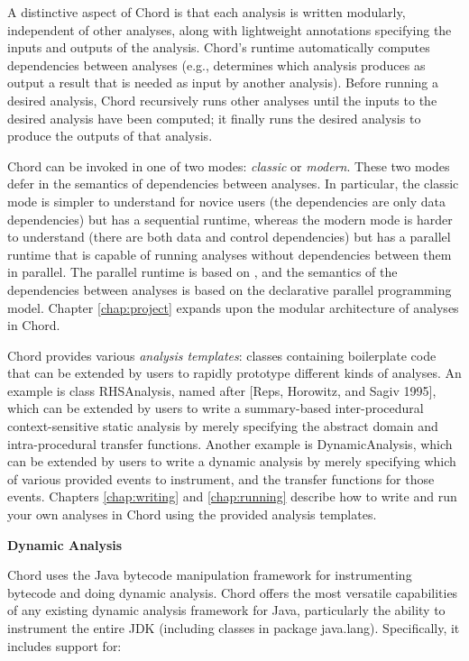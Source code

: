 A distinctive aspect of Chord is that each analysis is written modularly,
independent of other analyses, along with lightweight annotations specifying the
inputs and outputs of the analysis.  Chord's runtime automatically computes
dependencies between analyses (e.g., determines which analysis produces as
output a result that is needed as input by another analysis).  Before running a
desired analysis, Chord recursively runs other analyses until the inputs to the
desired analysis have been computed; it finally runs the desired analysis to
produce the outputs of that analysis.

Chord can be invoked in one of two modes: {\it classic} or {\it modern}.  These
two modes defer in the semantics of dependencies between analyses.  In
particular, the classic mode is simpler to understand for novice users (the
dependencies are only data dependencies) but has a sequential runtime, whereas
the modern mode is harder to understand (there are both data and control
dependencies) but has a parallel runtime that is capable of running analyses
without dependencies between them in parallel.  The parallel runtime is based on
, and the semantics of
the dependencies between analyses is based on the
declarative parallel programming model.  Chapter \ref{chap:project} expands upon
the modular architecture of analyses in Chord.

Chord provides various {\it analysis templates}: classes containing boilerplate
code that can be extended by users to rapidly prototype different kinds of
analyses.  An example is class RHSAnalysis, named after [Reps, Horowitz, and
Sagiv 1995], which can be extended by users to write a summary-based
inter-procedural context-sensitive static analysis by merely specifying the
abstract domain and intra-procedural transfer functions.  Another example is
DynamicAnalysis, which can be extended by users to write a dynamic analysis by
merely specifying which of various provided events to instrument, and the
transfer functions for those events.  Chapters \ref{chap:writing} and
\ref{chap:running} describe how to write and run your own analyses in Chord
using the provided analysis templates.

{\bf Dynamic Analysis}

Chord uses the  Java bytecode
manipulation framework for instrumenting bytecode and doing dynamic analysis.
Chord offers the most versatile capabilities of any existing dynamic analysis
framework for Java, particularly the ability to instrument the entire JDK
(including classes in package java.lang).  Specifically, it includes support
for:

